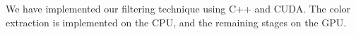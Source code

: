 \begin{columns}
{\begin{minipage}[t]{1.0\linewidth}
\begin{multicols*}{2}
		We have implemented our filtering technique using C++ and CUDA. The color extraction is implemented on the CPU, and the remaining stages on the GPU.
		
		\lipsum[0-4]

	\end{multicols*}
	\end{minipage}%
      
	}
	
	

\end{columns}
